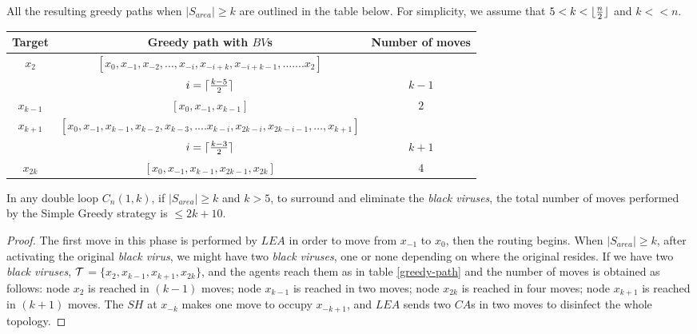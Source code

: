 All the resulting greedy paths when  $\left\vert{S_{area}}\right\vert \ge k$ are outlined in the table below. For simplicity, we assume that $5<k<\lfloor {n \over 2} \rfloor$ and $k<<n$.

\begin{center}
  \begin{tabular}{|c|c|c|}
 \hline
 Target & Greedy path with $BV$s & Number of moves \\
 
 \hline
$x_2$ &$[x_0, x_{-1}, x_{-2},\ldots, x_{-i},x_{-i+k}, x_{-i+k-1},\ldots.... x_2]$ & \\
&$i =  \lceil{{ k-5} \over 2}\rceil$  & $k-1$ \\ 
\hline
 $x_{k-1}$ & $[x_0, x_{-1}, x_{k-1}]$ & $2$ \\

 \hline
 $x_{k+1}$ &  $[x_0, x_{-1}, x_{k-1}, x_{k-2}, x_{k-3},.... x_{k-i}, x_{2k-i}, x_{2k-i-1}, \ldots, x_{k+1}]$ &\\
    &  $i = \lceil{{ k-3} \over 2}\rceil$   & $k+1$ \\
 
 \hline
 $x_{2k}$ & $[x_0, x_{-1}, x_{k-1}, x_{2k-1},x_{2k}]$ & $4$ \\ %

\hline
\end{tabular} 
\label{greedy-path}

 \end{center}
\begin{theorem}
In any double loop  $C_n(1,k)$,  if $\left\vert{S_{area}}\right\vert \geq  k$ and $k>5$, to surround and eliminate the {\it black viruses},
 the total number of moves performed by the Simple Greedy strategy is $\leq 2k+10$.
\end{theorem}
\begin{proof}
The first move in this phase is performed by $LEA$ in order to move from $x_{-1}$ to $x_0$, then the routing begins. When  $\left\vert{S_{area}}\right\vert \ge k$, after activating the original {\it black virus}, we might have two {\it black viruses}, one \bv or none depending on where the original \bv resides.
If we have two {\it black viruses}, ${\cal T}$$=\{x_{2},x_{k-1},x_{k+1},x_{2k}\}$, and the agents reach them as in table \ref{greedy-path} and the number of moves is obtained as follows: node $x_{2}$ is reached in $(k-1)$ moves; node $x_{k-1}$ is reached in two moves; node $x_{2k}$ is reached in four moves; node $x_{k+1}$ is reached in $(k+1)$ moves. The $SH$ at $x_{-k}$ makes one move to occupy $x_{-k+1}$, and $LEA$ sends two $CA$s in two moves to disinfect the whole topology.

\end{proof}

